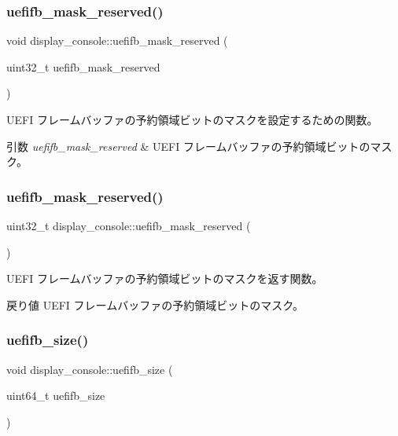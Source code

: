 \subsubsection{\texorpdfstring{uefifb\+\_\+mask\+\_\+reserved()}{uefifb\_mask\_reserved()}\hspace{0.1cm}{\footnotesize\ttfamily [1/2]}}
{\footnotesize\ttfamily void display\+\_\+console\+::uefifb\+\_\+mask\+\_\+reserved (\begin{DoxyParamCaption}\item[{uint32\+\_\+t}]{uefifb\+\_\+mask\+\_\+reserved }\end{DoxyParamCaption})}

U\+E\+FI フレームバッファの予約領域ビットのマスクを設定するための関数。 
\begin{DoxyParams}{引数}
{\em uefifb\+\_\+mask\+\_\+reserved} & U\+E\+FI フレームバッファの予約領域ビットのマスク。 \\
\hline
\end{DoxyParams}
\hypertarget{classdisplay__console_a0b8ca02c6a0ea909732ec813bcc8b8a7}{}\label{classdisplay__console_a0b8ca02c6a0ea909732ec813bcc8b8a7} 
\subsubsection{\texorpdfstring{uefifb\+\_\+mask\+\_\+reserved()}{uefifb\_mask\_reserved()}\hspace{0.1cm}{\footnotesize\ttfamily [2/2]}}
{\footnotesize\ttfamily uint32\+\_\+t display\+\_\+console\+::uefifb\+\_\+mask\+\_\+reserved (\begin{DoxyParamCaption}{ }\end{DoxyParamCaption})}

U\+E\+FI フレームバッファの予約領域ビットのマスクを返す関数。 \begin{DoxyReturn}{戻り値}
U\+E\+FI フレームバッファの予約領域ビットのマスク。 
\end{DoxyReturn}
\hypertarget{classdisplay__console_afb29b425b4809708e4d1c89a2717847b}{}\label{classdisplay__console_afb29b425b4809708e4d1c89a2717847b} 
\subsubsection{\texorpdfstring{uefifb\+\_\+size()}{uefifb\_size()}\hspace{0.1cm}{\footnotesize\ttfamily [1/2]}}
{\footnotesize\ttfamily void display\+\_\+console\+::uefifb\+\_\+size (\begin{DoxyParamCaption}\item[{uint64\+\_\+t}]{uefifb\+\_\+size }\end{DoxyParamCaption})}

